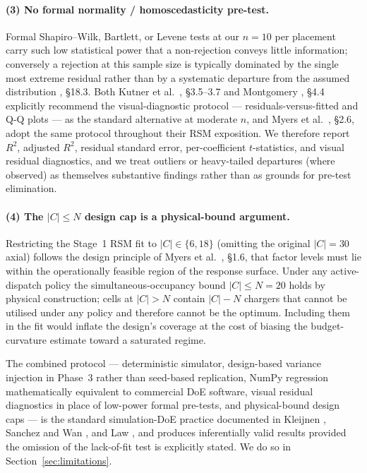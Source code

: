 \documentclass[conference]{IEEEtran}
\begin{document}
\paragraph{(3) No formal normality / homoscedasticity pre-test.}
Formal Shapiro--Wilk, Bartlett, or Levene tests at our $n = 10$ per placement carry such low statistical power that a non-rejection conveys little information; conversely a rejection at this sample size is typically dominated by the single most extreme residual rather than by a systematic departure from the assumed distribution \cite{kutner2005}, \S 18.3. Both Kutner et al.\ \cite{kutner2005}, \S 3.5--3.7 and Montgomery \cite{montgomery2017}, \S 4.4 explicitly recommend the visual-diagnostic protocol --- residuals-versus-fitted and Q-Q plots --- as the standard alternative at moderate $n$, and Myers et al.\ \cite{myers2016}, \S 2.6, adopt the same protocol throughout their RSM exposition. We therefore report $R^2$, adjusted $R^2$, residual standard error, per-coefficient $t$-statistics, and visual residual diagnostics, and we treat outliers or heavy-tailed departures (where observed) as themselves substantive findings rather than as grounds for pre-test elimination.

\paragraph{(4) The $|C| \le N$ design cap is a physical-bound argument.}
Restricting the Stage~1 RSM fit to $|C| \in \{6, 18\}$ (omitting the original $|C| = 30$ axial) follows the design principle of Myers et al.\ \cite{myers2016}, \S 1.6, that factor levels must lie within the operationally feasible region of the response surface. Under any active-dispatch policy the simultaneous-occupancy bound $|C| \le N = 20$ holds by physical construction; cells at $|C| > N$ contain $|C| - N$ chargers that cannot be utilised under any policy and therefore cannot be the optimum. Including them in the fit would inflate the design's coverage at the cost of biasing the budget-curvature estimate toward a saturated regime.

The combined protocol --- deterministic simulator, design-based variance injection in Phase~3 rather than seed-based replication, NumPy regression mathematically equivalent to commercial DoE software, visual residual diagnostics in place of low-power formal pre-tests, and physical-bound design caps --- is the standard simulation-DoE practice documented in Kleijnen \cite{kleijnen2015}, Sanchez and Wan \cite{sanchez2015}, and Law \cite{law2015}, and produces inferentially valid results provided the omission of the lack-of-fit test is explicitly stated. We do so in Section~\ref{sec:limitations}.
\end{document}
